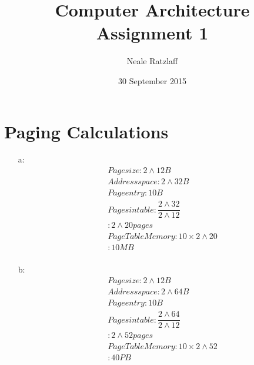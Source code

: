 \documentclass[letterpaper,10pt,titlepage]{article}
\title{Computer Architecture Assignment 1}
\author{Neale Ratzlaff}
\date{30 September 2015}
\begin{document}
\maketitle
\pagebreak

\section{Paging Calculations}

    \begin{itemize}
    
        \item[a:]
            \begin{equation}
                \begin{aligned}
                    & Page size         : 2\wedge12B \\
                    & Address space     : 2\wedge32B \\
                    & Page entry        : 10B  \\ 
                    & Pages in table    : \dfrac{2\wedge32}{2\wedge12} \\
                    &                   : 2\wedge20 pages \\
                    & Page Table Memory : 10\times2\wedge20 \\
                    &                   : 10MB \\
                \end{aligned}
            \end{equation}
        
        \item[b:]  
            \begin{equation}
                \begin{aligned}
                    & Page size         : 2\wedge12B \\
                    & Address space     : 2\wedge64B \\
                    & Page entry        : 10B  \\
                    & Pages in table    : \dfrac{2\wedge64}{2\wedge12} \\
                    &                   : 2\wedge52 pages \\
                    & Page Table Memory : 10\times2\wedge52 \\
                    &                   : 40PB \\
                \end{aligned}
            \end{equation}
        

\end{itemize}
\end{document}
